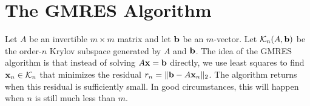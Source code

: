 \section*{The GMRES Algorithm}
Let $A$ be an invertible $m \times m$ matrix and let ${\bf b}$ be an $m$-vector.
Let $\mathcal{K}_n(A, {\bf b})$ be the order-$n$ Krylov subspace generated by $A$ and ${\bf b}$.
The idea of the GMRES algorithm is that instead of solving $A{\bf x} = {\bf b}$ directly, we use least squares to find ${\bf x}_n \in \mathcal{K}_n$ that minimizes the residual $r_n = \|{\bf b} - A{\bf x}_n\|_2$.
The algorithm returns when this residual is sufficiently small.
In good circumstances, this will happen when $n$ is still much less than $m$.

